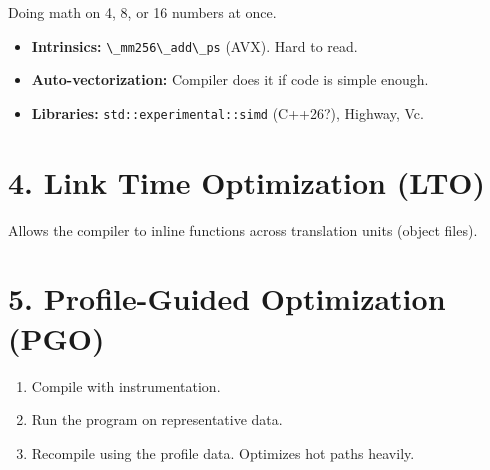 Doing math on 4, 8, or 16 numbers at once.

\begin{itemize}
\tightlist
\item
  \textbf{Intrinsics:} \passthrough{\lstinline!\_mm256\_add\_ps!} (AVX).
  Hard to read.
\item
  \textbf{Auto-vectorization:} Compiler does it if code is simple
  enough.
\item
  \textbf{Libraries:} \passthrough{\lstinline!std::experimental::simd!}
  (C++26?), Highway, Vc.
\end{itemize}

\hypertarget{link-time-optimization-lto}{%
\section{4. Link Time Optimization
(LTO)}\label{link-time-optimization-lto}}

Allows the compiler to inline functions across translation units (object
files).

\hypertarget{profile-guided-optimization-pgo}{%
\section{5. Profile-Guided Optimization
(PGO)}\label{profile-guided-optimization-pgo}}

\begin{enumerate}
\def\labelenumi{\arabic{enumi}.}
\tightlist
\item
  Compile with instrumentation.
\item
  Run the program on representative data.
\item
  Recompile using the profile data. Optimizes hot paths heavily.
\end{enumerate}

